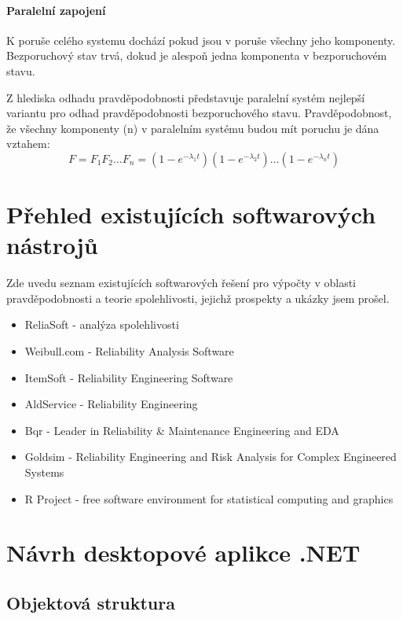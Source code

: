 \documentclass[FM,RP]{tulthesis}
\begin{document}
        \subsubsection*{Paralelní zapojení}
            K poruše celého systemu dochází pokud jsou v poruše všechny jeho komponenty. Bezporuchový stav trvá, dokud je alespoň jedna komponenta v bezporuchovém stavu.
            
            Z hlediska odhadu pravděpodobnosti představuje paralelní systém nejlepší variantu pro odhad pravděpodobnosti bezporuchového stavu. \cite{5}
            Pravděpodobnost, že všechny komponenty (n) v paralelním systému budou mít poruchu je dána vztahem:
            $$ F = F_{1}F_{2}...F_{n} = (1-e^{-\lambda_{1}t})(1-e^{-\lambda_{2}t})...(1-e^{-\lambda_{n}t}) $$



\chapter{Přehled existujících softwarových nástrojů}
    Zde uvedu seznam existujících softwarových řešení pro výpočty v oblasti pravděpodobnosti a teorie spolehlivosti, jejichž prospekty a ukázky jsem prošel.
    \begin{itemize} 
    \item ReliaSoft - analýza spolehlivosti \cite{8}
    \item Weibull.com - Reliability Analysis Software \cite{9}
    \item ItemSoft - Reliability Engineering Software \cite{10}
    \item AldService - Reliability Engineering \cite{11}
    \item Bqr - Leader in Reliability \& Maintenance Engineering and EDA \cite{12}
    \item Goldsim - Reliability Engineering and Risk Analysis for Complex Engineered Systems \cite{13}
    \item R Project - free software environment for statistical computing and graphics \cite{14}
    \end{itemize}

\chapter{Návrh desktopové aplikce .NET}
    \section*{Objektová struktura}
\end{document}

